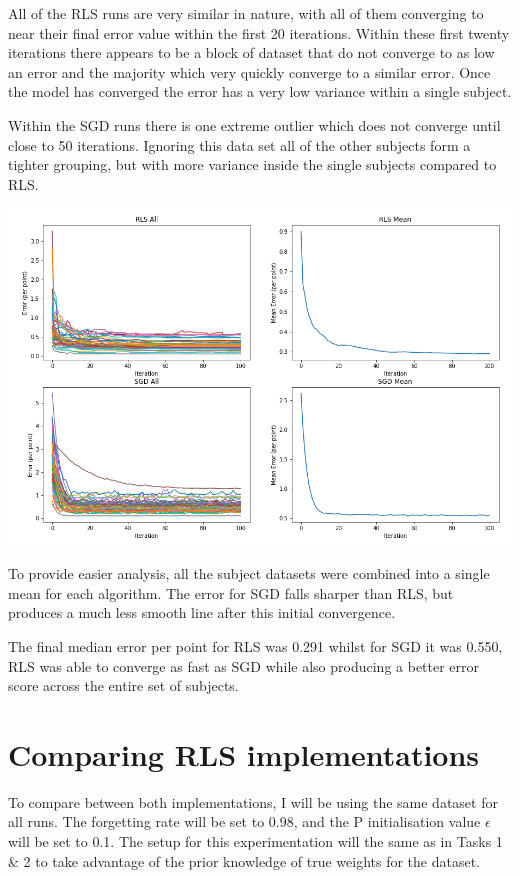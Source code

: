 \documentclass[sigconf]{acmart}
\begin{document}
All of the RLS runs are very similar in nature, with all of them converging to near their final error value within the first 20 iterations. Within these first twenty iterations there appears to be a block of dataset that do not converge to as low an error and the majority which very quickly converge to a similar error. Once the model has converged the error has a very low variance within a single subject.

Within the SGD runs there is one extreme outlier which does not converge until close to 50 iterations. Ignoring this data set all of the other subjects form a tighter grouping, but with more variance inside the single subjects compared to RLS. 

\begin{center}
    \includegraphics[width=\linewidth]{figs/ParkinsonsALL.png}
\end{center}

To provide easier analysis, all the subject datasets were combined into a single mean for each algorithm. 
The error for SGD falls sharper than RLS, but produces a much less smooth line after this initial convergence. 

The final median error per point for RLS was 0.291 whilst for SGD it was 0.550, RLS was able to converge as fast as SGD while also producing a better error score across the entire set of subjects.

\section{Comparing RLS implementations}
To compare between both implementations, I will be using the same dataset for all runs. The forgetting rate will be set to 0.98, and the P initialisation value $\epsilon$ will be set to 0.1.
The setup for this experimentation will the same as in Tasks 1 \& 2 to take advantage of the prior knowledge of true weights for the dataset.
\end{document}
